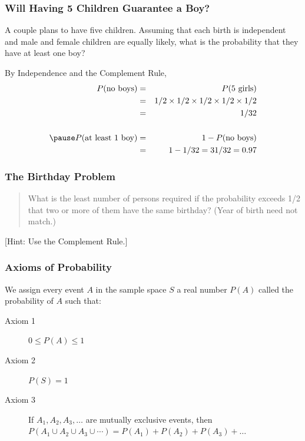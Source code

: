\documentclass{beamer}
\begin{document}

\begin{frame}
\frametitle{Will Having 5 Children Guarantee a Boy? }
A couple plans to have five children. Assuming that each birth is independent and male and female children are equally likely, what is the probability that they have at least one boy?
\vspace{1em}

\pause
\alert{By Independence and the Complement Rule,}
	\begin{eqnarray*}
		P(\mbox{no boys})&=& P(\mbox{5 girls})\\
							&=& 1/2 \times 1/2 \times 1/2 \times 1/2 \times 1/2\\
							&=&\ 1/32\\ \\ \pause
		P(\mbox{at least 1 boy})&=&1 - P(\mbox{no boys})\\
		&=&1 - 1/32 =31/32 = 0.97
	\end{eqnarray*}

\end{frame}

\begin{frame}
\frametitle{The Birthday Problem}
	\begin{quote}
		What is the least number of persons required if the probability exceeds 1/2 that two or more of them have the same birthday? (Year of birth need not match.)
	\end{quote}
	
	\hfill \alert{[Hint: Use the Complement Rule.]}
\end{frame}


\begin{frame}
\frametitle{Axioms of Probability}
We assign every event $A$ in the sample space $S$ a real number $P(A)$ called the \alert{probability of $A$} such that: 
\vspace{1em}
\begin{description}
	\item[Axiom 1] $0 \leq P(A) \leq 1$
	\item[Axiom 2] $P(S)=1$
	\item[Axiom 3] If $A_1, A_2, A_3, \hdots$ are mutually exclusive events, then $P(A_1\cup A_2 \cup A_3 \cup \cdots) = P(A_1) + P(A_2) + P(A_3) + \hdots$
\end{description}

\end{frame}
\end{document}
